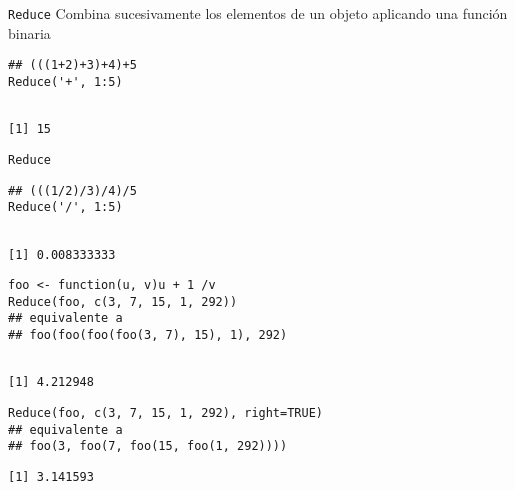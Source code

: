 \documentclass[xcolor={usenames,svgnames,dvipsnames}]{beamer}
\begin{document}
\begin{frame}[label={sec:orgd71f79d},fragile]{\texttt{Reduce}}
 Combina sucesivamente los elementos de un objeto aplicando una función binaria
\lstset{language=r,label= ,caption= ,captionpos=b,numbers=none}
\begin{lstlisting}
## (((1+2)+3)+4)+5
Reduce('+', 1:5)
\end{lstlisting}

\begin{verbatim}

[1] 15
\end{verbatim}
\end{frame}

\begin{frame}[label={sec:orgca0e686},fragile]{\texttt{Reduce}}
 \lstset{language=r,label= ,caption= ,captionpos=b,numbers=none}
\begin{lstlisting}
## (((1/2)/3)/4)/5
Reduce('/', 1:5)
\end{lstlisting}

\begin{verbatim}

[1] 0.008333333
\end{verbatim}


\lstset{language=r,label= ,caption= ,captionpos=b,numbers=none}
\begin{lstlisting}
foo <- function(u, v)u + 1 /v
Reduce(foo, c(3, 7, 15, 1, 292))
## equivalente a
## foo(foo(foo(foo(3, 7), 15), 1), 292)
\end{lstlisting}

\begin{verbatim}

[1] 4.212948
\end{verbatim}


\lstset{language=r,label= ,caption= ,captionpos=b,numbers=none}
\begin{lstlisting}
Reduce(foo, c(3, 7, 15, 1, 292), right=TRUE)
## equivalente a
## foo(3, foo(7, foo(15, foo(1, 292))))
\end{lstlisting}

\begin{verbatim}
[1] 3.141593
\end{verbatim}
\end{frame}
\end{document}
